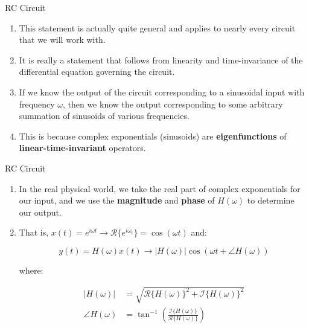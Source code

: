 \documentclass[hyperref={bookmarks=false},aspectratio=169]{beamer}
\begin{document}
	\begin{frame}{RC Circuit}
		\begin{enumerate}
			\item This statement is actually quite general and applies to nearly every circuit that we will work with.
			
			\item It is really a statement that follows from linearity and time-invariance of the differential equation governing the circuit.
			
			\item If we know the output of the circuit corresponding to a sinusoidal input with frequency $\omega$, then we know the output corresponding to some arbitrary summation of sinusoids of various frequencies.
			
			\item This is because complex exponentials (sinusoids) are \textbf{eigenfunctions} of \textbf{linear-time-invariant} operators. 
		\end{enumerate}
	\end{frame}
	
	\begin{frame}{RC Circuit}
		\begin{enumerate}
			\item In the real physical world, we take the real part of complex exponentials for our input, and we use the \textbf{magnitude} and \textbf{phase} of $H(\omega)$ to determine our output.
			\item That is, $x(t) = e^{i\omega t} \rightarrow \mathcal{R}\{e^{i\omega_t}\} = \cos(\omega t)$ and:
			
				\begin{equation} \label{eqn:output_to_sinusoid}
					y(t) = H(\omega)x(t) \rightarrow |H(\omega)| \cos(\omega t + \angle H(\omega))
				\end{equation}
		
			where:

				\begin{align}
					|H(\omega)| &= \sqrt{\mathcal{R}\{H(\omega)\}^2 + \mathcal{I}\{H(\omega)\}^2} \\
					\angle H(\omega) &= \tan^{-1} \left(\frac{\mathcal{I}\{H(\omega)\}}{\mathcal{R}\{H(\omega)\}}\right)
				\end{align}
		\end{enumerate}
	\end{frame}
	
\end{document}
